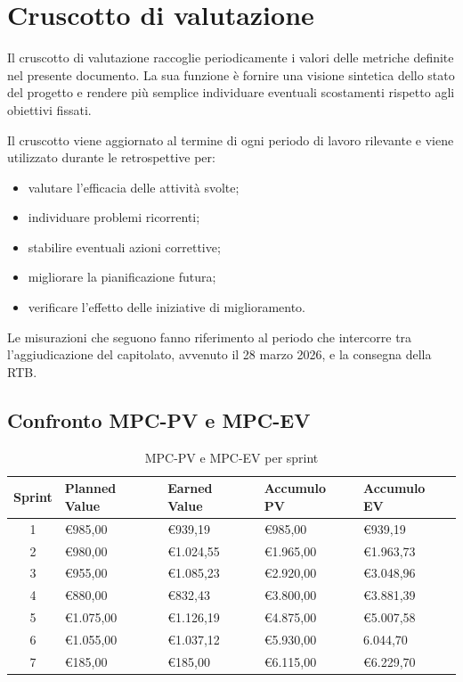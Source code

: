\documentclass[a4paper, 10pt, colorlinks=true, linkcolor=black, urlcolor=blue, citecolor=blue, hidelinks]{article}
\begin{document}
\section{Cruscotto di valutazione}

Il cruscotto di valutazione raccoglie periodicamente i valori delle metriche definite nel presente documento. La sua funzione è fornire una visione sintetica dello stato del progetto e rendere più semplice individuare eventuali scostamenti rispetto agli obiettivi fissati.

Il cruscotto viene aggiornato al termine di ogni periodo di lavoro rilevante e viene utilizzato durante le retrospettive per:
\begin{itemize}
    \item valutare l'efficacia delle attività svolte;
    \item individuare problemi ricorrenti;
    \item stabilire eventuali azioni correttive;
    \item migliorare la pianificazione futura;
    \item verificare l'effetto delle iniziative di miglioramento.
\end{itemize}

Le misurazioni che seguono fanno riferimento al periodo che intercorre tra l'aggiudicazione del capitolato, avvenuto il 28 marzo 2026, e la consegna della RTB.

\subsection{Confronto MPC-PV e MPC-EV}
\begin{table}[H]
    \centering
	\begin{tabular}{|c|l|l|l|l|}
		\hline
		\textbf{Sprint} & \textbf{Planned Value} & \textbf{Earned Value} & \textbf{Accumulo PV} & \textbf{Accumulo EV} \\
		\hline
		1 & €985,00 & €939,19 & €985,00 & €939,19 \\ 
		\hline
        2 & €980,00 & €1.024,55 & €1.965,00 & €1.963,73 \\
        \hline
        3 & €955,00 & €1.085,23 & €2.920,00 & €3.048,96 \\
        \hline
        4 & €880,00 & €832,43 & €3.800,00 & €3.881,39 \\
        \hline
        5 & €1.075,00 & €1.126,19 & €4.875,00 & €5.007,58 \\
        \hline
        6 & €1.055,00 & €1.037,12 & €5.930,00 & 6.044,70 \\
        \hline
        7 & €185,00 & €185,00 & €6.115,00 & €6.229,70 \\
        \hline
	\end{tabular}
	\caption{MPC-PV e MPC-EV per sprint}
	\label{tab:pv-ev}
\end{table}
\end{document}
